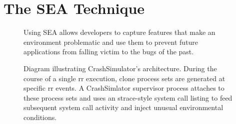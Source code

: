 \section{The SEA Technique}
\label{SEC:approach}

\begin{figure}[t]
  \center{}
  \caption{Using SEA allows developers to capture features that make an
    environment problematic and use them to prevent future applications
    from falling victim to the bugs of the past.}
  \label{figure:approach}
\end{figure}

\begin{figure}[t]
  \center{}
  \caption{Diagram illustrating CrashSimulator's architecture.  During the
    course of a single rr execution, clone process sets are generated at
    specific rr events.  A CrashSimlator supervisor process attaches to
    these process sets and uses an strace-style system call listing to feed
    subsequent system call activity and inject unusual environmental
    conditions.}
  \label{figure:architecture}
\end{figure}

